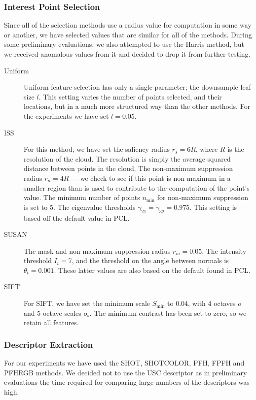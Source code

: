 \documentclass[11pt,a4paper]{kth-mag}
\begin{document}
\subsubsection{Interest Point Selection}
Since all of the selection methods use a radius value for computation in some
way or another, we have selected values that are similar for all of the methods.
During some preliminary evaluations, we also attempted to use the Harris method,
but we received anomalous values from it and decided to drop it from further
testing.
\begin{description}
\item[Uniform] Uniform feature selection has only a single parameter; the
  downsample leaf size $l$. This setting varies the number of points selected,
  and their locations, but in a much more structured way than the other methods.
  For the experiments we have set $l=0.05$.
\item[ISS] For this method, we have set the saliency radius $r_s=6R$, where $R$
  is the resolution of the cloud. The resolution is simply the average squared
  distance between points in the cloud. The non-maximum suppression radius
  $r_n=4R$ --- we check to see if this point is non-maximum in a smaller
  region than is used to contribute to the computation of the point's value. The
  minimum number of points $n_{\min}$ for non-maximum suppression is set to 5.
  The eigenvalue thresholds $\gamma_{21}=\gamma_{32}=0.975$. This setting is
  based off the default value in PCL.
\item[SUSAN] The mask and non-maximum suppression radius $r_m=0.05$. The
  intensity threshold $I_t=7$, and the threshold on the angle between normals is
  $\theta_t=0.001$. These latter values are also based on the default found in
  PCL.
\item[SIFT] For SIFT, we have set the minimum scale $S_{\min}$ to 0.04, with 4
  octaves $o$ and 5 octave scales $o_s$. The minimum contrast has been set to
  zero, so we retain all features.
\end{description}

\subsubsection{Descriptor Extraction}
For our experiments we have used the SHOT, SHOTCOLOR, PFH, FPFH and PFHRGB
methods. We decided not to use the USC descriptor as in preliminary evaluations
the time required for comparing large numbers of the descriptors was high.
\end{document}
